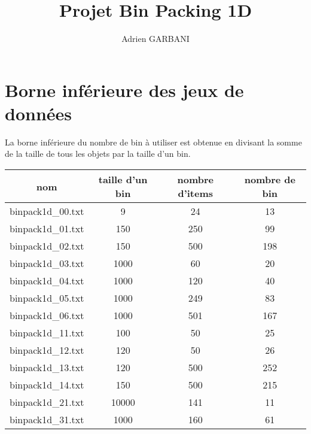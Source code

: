 \documentclass[10pt,a4paper]{article}
\author{Adrien GARBANI}
\title{Projet Bin Packing 1D}
\begin{document}
\maketitle

\section{Borne inférieure des jeux de données}

La borne inférieure du nombre de bin à utiliser est obtenue en divisant la somme de la taille de tous les objets par la taille d'un bin.

\begin{center}
  \begin{tabular}{ | c | c | c | c | }  \hline
    nom               & taille d'un bin & nombre d'items & nombre de bin \\ \hline
    binpack1d\_00.txt & 9               & 24             & 13            \\ \hline
    binpack1d\_01.txt & 150             & 250            & 99            \\ \hline
    binpack1d\_02.txt & 150             & 500            & 198           \\ \hline
    binpack1d\_03.txt & 1000            & 60             & 20            \\ \hline
    binpack1d\_04.txt & 1000            & 120            & 40            \\ \hline
    binpack1d\_05.txt & 1000            & 249            & 83            \\ \hline
    binpack1d\_06.txt & 1000            & 501            & 167           \\ \hline
    binpack1d\_11.txt & 100             & 50             & 25            \\ \hline
    binpack1d\_12.txt & 120             & 50             & 26            \\ \hline
    binpack1d\_13.txt & 120             & 500            & 252           \\ \hline
    binpack1d\_14.txt & 150             & 500            & 215           \\ \hline
    binpack1d\_21.txt & 10000           & 141            & 11            \\ \hline
    binpack1d\_31.txt & 1000            & 160            & 61            \\ \hline
  \end{tabular}
\end{center}
\end{document}
